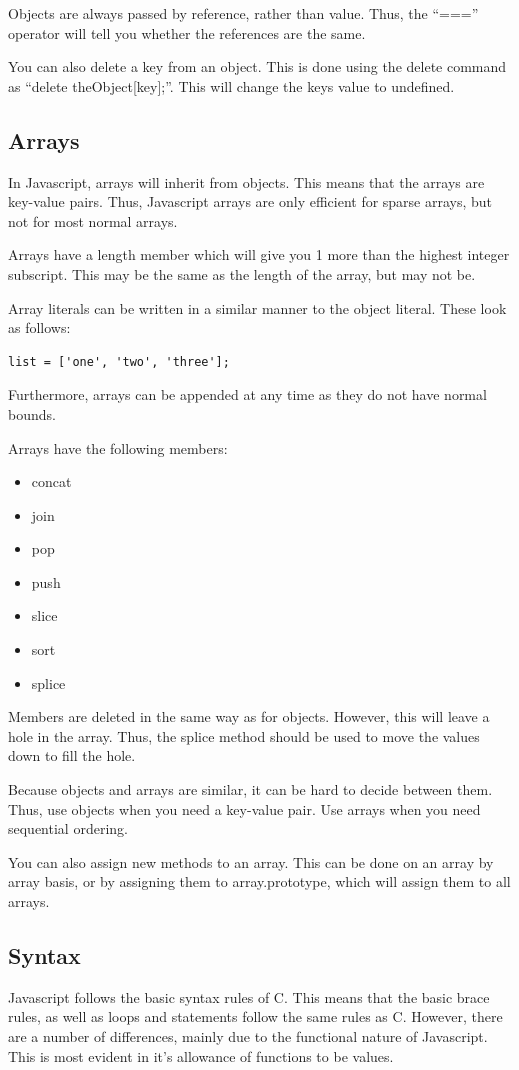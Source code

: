 \documentclass[a4paper,11pt]{report}
\begin{document}
			Objects are always passed by reference, rather than value. 
			Thus, the ``==='' operator will tell you whether the references are the same. 

			You can also delete a key from an object. 
			This is done using the delete command as ``delete theObject[key];''. 
			This will change the keys value to undefined. 
		\subsection{Arrays}
			In Javascript, arrays will inherit from objects. 
			This means that the arrays are key-value pairs. 
			Thus, Javascript arrays are only efficient for sparse arrays, but not for most normal arrays. 

			Arrays have a length member which will give you 1 more than the highest integer subscript. 
			This may be the same as the length of the array, but may not be. 

			Array literals can be written in a similar manner to the object literal. 
			These look as follows:
			\begin{verbatim}
list = ['one', 'two', 'three'];
			\end{verbatim}
			Furthermore, arrays can be appended at any time as they do not have normal bounds. 

			Arrays have the following members:
			\begin{itemize}
				\item concat
				\item join
				\item pop
				\item push 
				\item slice
				\item sort
				\item splice
			\end{itemize}

			Members are deleted in the same way as for objects. 
			However, this will leave a hole in the array. 
			Thus, the splice method should be used to move the values down to fill the hole. 

			Because objects and arrays are similar, it can be hard to decide between them. 
			Thus, use objects when you need a key-value pair. 
			Use arrays when you need sequential ordering. 

			You can also assign new methods to an array. 
			This can be done on an array by array basis, or by assigning them to array.prototype, 
			which will assign them to all arrays. 
		\subsection{Syntax}
			Javascript follows the basic syntax rules of C. 
			This means that the basic brace rules, as well as loops and statements follow the same rules as C. 
			However, there are a number of differences, mainly due to the functional nature of Javascript. 
			This is most evident in it's allowance of functions to be values. 
\end{document}
